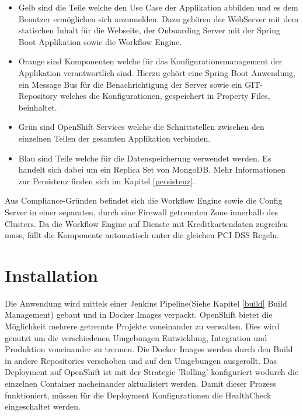 \begin{itemize}
	\item Gelb sind die Teile welche den Use Case der Applikation abbilden und es dem Benutzer ermöglichen sich anzumelden. Dazu gehören der WebServer mit dem statischen Inhalt für die Webseite, der Onboarding Server mit der Spring Boot Applikation sowie die Workflow Engine.
	\item Orange sind Komponenten welche für das Konfigurationsmanagement der Applikation verantwortlich sind. Hierzu gehört eine Spring Boot Anwendung, ein Message Bus für die Benachrichtigung der Server sowie ein GIT-Repository welches die Konfigurationen, gespeichert in Property Files, beinhaltet.
	\item Grün sind OpenShift Services welche die Schnittstellen zwischen den einzelnen Teilen der gesamten Applikation verbinden.
	\item Blau sind Teile welche für die Datenspeicherung verwendet werden. Es handelt sich dabei um ein Replica Set von MongoDB. Mehr Informationen zur Persistenz finden sich im Kapitel \ref{persistenz}.
\end{itemize}
Aus Compliance-Gründen befindet sich die Workflow Engine sowie die Config Server in einer separaten, durch eine Firewall getrennten Zone innerhalb des Clusters. Da die Workflow Engine auf Dienste mit Kreditkartendaten zugreifen muss, fällt die Komponente automatisch unter die gleichen PCI DSS Regeln. 

\section{Installation}

Die Anwendung wird mittels einer Jenkins Pipeline(Siehe Kapitel \ref{build} Build Management) gebaut und in Docker Images verpackt. OpenShift bietet die Möglichkeit mehrere getrennte Projekte voneinander zu verwalten. Dies wird genutzt um die verschiedenen Umgebungen Entwicklung, Integration und Produktion voneinander zu trennen. Die Docker Images werden durch den Build in andere Repositories verschoben und auf den Umgebungen ausgerollt. Das Deployment auf OpenShift ist mit der Strategie 'Rolling' konfiguriert wodurch die einzelnen Container nacheinander aktualisiert werden. Damit dieser Prozess funktioniert, müssen für die Deployment Konfigurationen die HealthCheck eingeschaltet werden.

